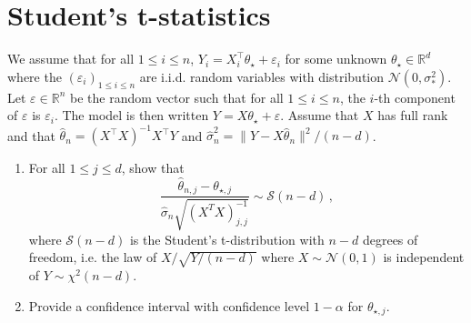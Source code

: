 \documentclass[a4paper,10pt,fleqn]{article}
\newcommand{\eqsp}{\,}
\newcommand{\rset}{\ensuremath{\mathbb{R}}}
\newcommand{\1}{\ensuremath{\mathbbm{1}}}
\newcommand{\param}{\theta}
\begin{document}
\section{Student's t-statistics}
We assume that  for all $1\leqslant i \leqslant n$, $Y_i = X^\top_i \param_{\star} + \varepsilon_i$ for some unknown $\param_\star\in\rset^d$ where the $(\varepsilon_i)_{1\leqslant i\leqslant n}$ are i.i.d. random variables with distribution $\mathcal{N}(0,\sigma_*^2)$. Let  $\varepsilon\in\rset^n$  be the random vector such that  for all $1\leqslant i \leqslant n$, the $i$-th component of $\varepsilon$  is $\varepsilon_i$. The model is then written $Y = X \param_{\star} + \varepsilon$. Assume that $X$ has full rank and that $\widehat \theta_n = (X^\top X)^{-1}X^\top Y$ and $\widehat \sigma^2_n = \|Y-X\widehat \theta_n\|^2/(n-d)$.
\begin{enumerate}
\item For all $1\leqslant j \leqslant d$, show that
$$
\frac{\widehat \param_{n,j} -\param_{\star,j}}{\widehat\sigma_{n}\sqrt{(X^TX)_{j,j}^{-1}}} \sim \mathcal{S}(n-d)\eqsp,
$$
where $\mathcal{S}(n-d)$ is the Student's t-distribution with $n-d$ degrees of freedom, i.e. the law of $X/\sqrt{Y/(n-d)}$ where $X\sim\mathcal{N}(0,1)$ is independent of $Y\sim\chi^2(n-d)$.

%
\item Provide a confidence interval with confidence level $1-\alpha$ for $\param_{\star,j}$.


\end{enumerate}
\end{document}
